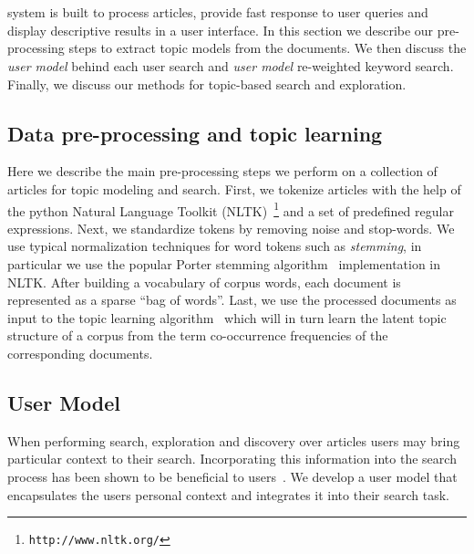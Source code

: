 \section{\system}


{\system} system is built to process articles,
provide fast response to user queries and display descriptive
results in a user interface.
In this section we describe our pre-processing steps to extract
topic models from the documents.
We then discuss the \textsl{user model} behind each user search and 
\textsl{user model} re-weighted keyword search.
Finally, we discuss our methods for topic-based search and exploration.



\subsection{Data pre-processing and topic learning}

Here we describe the main pre-processing steps we perform on a 
collection of articles for topic modeling and search. First, 
we tokenize articles with the help of the python 
Natural Language Toolkit (NLTK)~\footnote{\texttt{http://www.nltk.org/}} and a set of 
predefined regular expressions. Next, we standardize tokens by 
removing noise and stop-words. We use typical normalization 
techniques for word tokens such as \textsl{stemming}, in particular we use the popular Porter stemming algorithm~\cite{Porter1980} 
implementation in NLTK\@. 
After building a vocabulary of corpus words, each document is represented as a sparse ``bag of words''.
Last, we use the processed documents as input to the topic 
learning algorithm~\cite{hoffman2010online} which will in turn learn 
the latent topic structure of a corpus from the term co-occurrence 
frequencies of the corresponding documents. %



\subsection{User Model}
When performing search, exploration and discovery over articles 
users may bring particular context to their search. Incorporating 
this information into the search process has been shown to be 
beneficial to users~\cite{DZSRWJ,MZPGSOL}. We develop a user model 
that encapsulates the users personal context and integrates it into 
their search task. 

